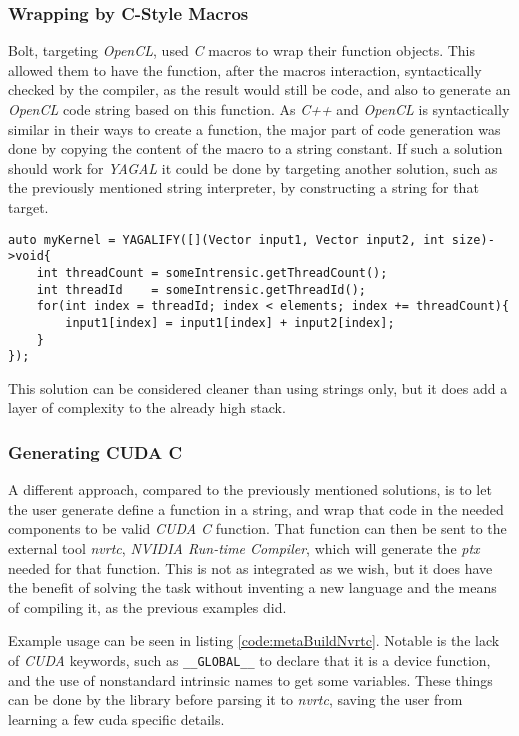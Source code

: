 \subsubsection{Wrapping by C-Style Macros}
Bolt, targeting \textit{OpenCL}, used \textit{C} macros to wrap their function objects. This allowed them to have the function, after the macros interaction, syntactically checked by the compiler, as the result would still be code, and also to generate an \textit{OpenCL} code string based on this function. As \textit{C++} and \textit{OpenCL} is syntactically similar in their ways to create a function, the major part of code generation was done by copying the content of the macro to a string constant. If such a solution should work for \textit{YAGAL} it could be done by targeting another solution, such as the previously mentioned string interpreter, by constructing a string for that target.

\begin{lstlisting}[caption={Code showing possible construction of kernel with macro, named YAGALIFY, and c++ lambda.}, label={code:metaBuildMacro}]
auto myKernel = YAGALIFY([](Vector input1, Vector input2, int size)->void{
    int threadCount = someIntrensic.getThreadCount();
    int threadId    = someIntrensic.getThreadId();
    for(int index = threadId; index < elements; index += threadCount){
        input1[index] = input1[index] + input2[index];
    }
});
\end{lstlisting}

This solution can be considered cleaner than using strings only, but it does add a layer of complexity to the already high stack.

\subsubsection{Generating CUDA C}
A different approach, compared to the previously mentioned solutions, is to let the user generate define a function in a string, and wrap that code in the needed components to be valid \textit{CUDA C} function. That function can then be sent to the external tool \textit{nvrtc}, \textit{NVIDIA Run-time Compiler}, which will generate the \textit{ptx} needed for that function. This is not as integrated as we wish, but it does have the benefit of solving the task without inventing a new language and the means of compiling it, as the previous examples did.

Example usage can be seen in listing \ref{code:metaBuildNvrtc}. Notable is the lack of \textit{CUDA} keywords, such as \texttt{\_\_GLOBAL\_\_} to declare that it is a device function, and the use of nonstandard intrinsic names to get some variables. These things can be done by the library before parsing it to \textit{nvrtc}, saving the user from learning a few cuda specific details.

